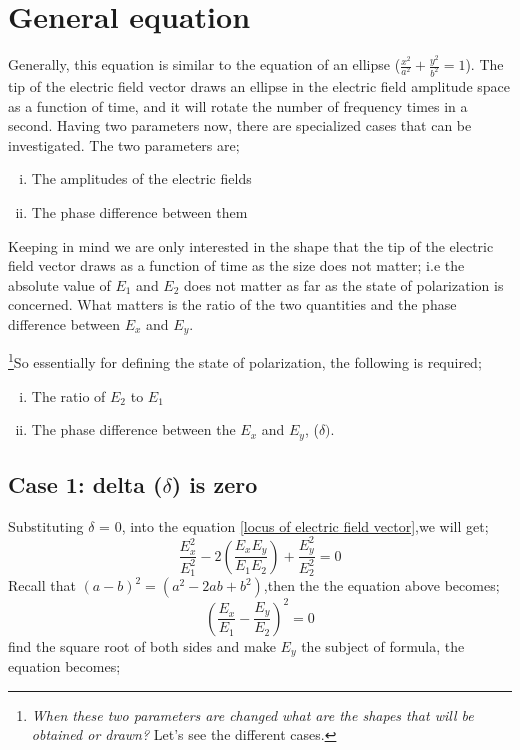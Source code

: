\section{General equation }
Generally, this equation is similar to the equation of an ellipse ($\frac{x^2}{a^2} + \frac{y^2}{b^2} = 1 $). The tip of the electric field vector draws an ellipse in the electric field amplitude space as a function of time, and it will rotate the number of frequency times in a second. Having two parameters now, there are specialized cases that can be investigated. The two parameters are;
\begin{enumerate}[(i)]
\item The amplitudes of the electric fields
\item The phase difference between them
\end{enumerate}
Keeping in mind we are only interested in the shape that the tip of the electric field vector draws as a function of time as the size does not matter; i.e the absolute value of $ E_1 $ and $ E_2 $ does not matter as far as the state of polarization is concerned. What matters is the ratio of the two quantities and the phase difference between $ E_x $ and $ E_y $.

\footnote{
\emph{When these two parameters are changed what are the shapes that will be obtained or drawn?} Let's see the different cases.
}So essentially for defining the state of polarization, the following is required;
\begin{enumerate}[(i)] 
\item The ratio of $ E_2 $ to $ E_1 $
\item The phase difference between the $ E_x $ and $ E_y $, ($\delta)$.
\end{enumerate}

\subsection{Case 1: delta ($\delta $) is zero}
Substituting $\delta$ = 0, into the equation \ref{locus of electric field vector},we will get;
\begin{equation}
\frac{E_{x}^2}{E_{1}^2} -2(\frac{E_{x}E_{y}}{E_{1}E_{2}}) + \frac{E_{y}^2}{E_{2}^2} = 0
\end{equation}
Recall that ${(a - b)}^2 = (a^2 -2ab +b^2)$,then the the equation above becomes;
\begin{equation}
{(\frac{E_x}{E_1} - \frac{E_y}{E_2})}^2 = 0
\end{equation}
find the square root of both sides and make $ E_y $ the subject of formula, the equation becomes;

